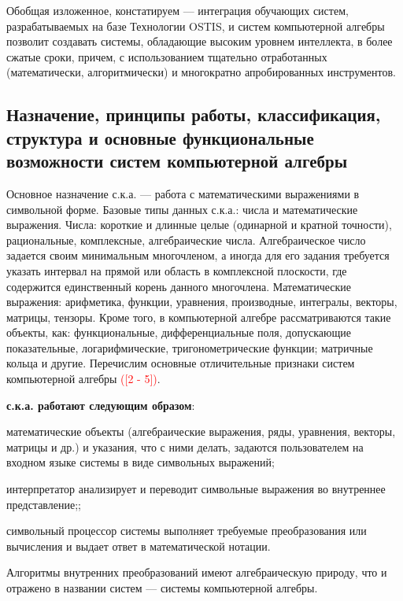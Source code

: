 Обобщая изложенное, констатируем --- интеграция обучающих систем, разрабатываемых на базе Технологии OSTIS, и систем компьютерной алгебры позволит создавать системы, обладающие высоким уровнем интеллекта, в более сжатые сроки, причем, с использованием тщательно отработанных (математически, алгоритмически) и многократно апробированных инструментов.

\subsection{Назначение, принципы работы, классификация, структура и основные функциональные возможности систем компьютерной алгебры}
\label{subsec_cas_principles}

Основное назначение с.к.а. --- работа с математическими выражениями в символьной форме. Базовые типы данных с.к.а.: числа и математические выражения. Числа: короткие и длинные целые (одинарной и кратной точности), рациональные, комплексные, алгебраические числа. Алгебраическое число задается своим минимальным многочленом, а иногда для его задания требуется указать интервал на прямой или область в комплексной плоскости, где содержится единственный корень данного многочлена. Математические выражения: арифметика, функции, уравнения, производные, интегралы, векторы, матрицы, тензоры. Кроме того, в компьютерной алгебре рассматриваются такие объекты, как: функциональные, дифференциальные поля, допускающие показательные, логарифмические, тригонометрические функции; матричные кольца и другие. Перечислим основные отличительные признаки систем компьютерной алгебры \textcolor{red}{([2 - 5])}.

\textbf{с.к.а. работают следующим образом}:
\begin{textitemize}
	\item математические объекты (алгебраические выражения, ряды, уравнения, векторы, матрицы и др.) и указания, что с ними делать, задаются пользователем на входном языке системы в виде символьных выражений;
	\item интерпретатор анализирует и переводит символьные выражения во внутреннее представление;;
	\item символьный процессор системы выполняет требуемые преобразования или вычисления и выдает ответ в математической нотации.
\end{textitemize}
Алгоритмы внутренних преобразований имеют алгебраическую природу, что и отражено в названии систем --- системы компьютерной алгебры.

